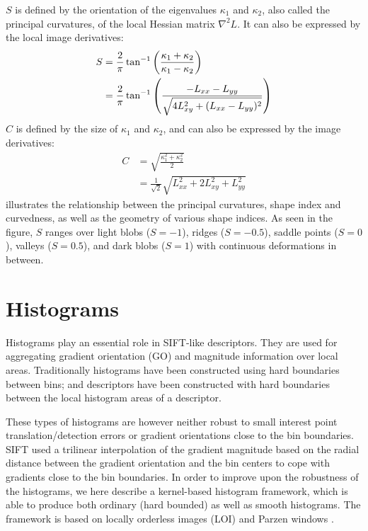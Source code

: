 \documentclass[thesis.tex]{subfiles}
\begin{document}
$S$ is defined by the orientation of the eigenvalues $\kappa_1$ and $\kappa_2$, also called the principal curvatures, of the local Hessian matrix $\nabla^2 L$. It can also be expressed by the local image derivatives:
%
\begin{align}
S &= \frac{2}{\pi} \tan^{-1} \left( \frac{\kappa_1 + \kappa_2}{\kappa_1 - \kappa_2} \right) \\
&= \frac{2}{\pi} \tan^{-1} \left( \frac{-L_{xx} - L_{yy}}{\sqrt{4 L_{xy}^2 + (L_{xx} - L_{yy})^2}} \right)
\end{align}
%
$C$ is defined by the size of $\kappa_1$ and $\kappa_2$, and can also be expressed by the image derivatives:
%
\begin{align}
C &= \sqrt{\frac{\kappa_1^2 + \kappa_2^2}{2}} \\
&= \frac{1}{\sqrt2} \sqrt{L_{xx}^2 + 2 L_{xy}^2 + L_{yy}^2}
\end{align}
%
 illustrates the relationship between the principal curvatures, shape index and curvedness, as well as the geometry of various shape indices. As seen in the figure, $S$ ranges over light blobs ($S = -1$), ridges ($S = -0.5$), saddle points ($S = 0$), valleys ($S = 0.5$), and dark blobs ($S = 1$) with continuous deformations in between.
%
\section{Histograms}
\label{sec:histograms}

Histograms play an essential role in SIFT-like descriptors. They are used for aggregating gradient orientation (GO) and magnitude information over local areas. Traditionally histograms have been constructed using hard boundaries between bins; and descriptors have been constructed with hard boundaries between the local histogram areas of a descriptor.

These types of histograms are however neither robust to small interest point translation/detection errors or gradient orientations close to the bin boundaries. SIFT used a trilinear interpolation of the gradient magnitude based on the radial distance between the gradient orientation and the bin centers to cope with gradients close to the bin boundaries. In order to improve upon the robustness of the histograms, we here describe a kernel-based histogram framework, which is able to produce both ordinary (hard bounded) as well as smooth histograms. The framework is based on locally orderless images (LOI) \cite{koenderink1999structure} and Parzen windows \cite{parzen1962estimation}.
\end{document}
